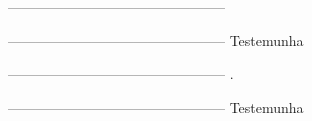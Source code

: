 \documentclass[12pt]{article}
\begin{document}


  \linespread{5}\selectfont


  \bigskip 
   \bigskip 
    \bigskip 
     \bigskip 
     
     
 \bigskip 
  \bigskip 
   \bigskip 
    \bigskip 
     \bigskip 
     
          
 \bigskip 
  \bigskip 
   \bigskip 
    \bigskip 
     \bigskip 
     
               
 \bigskip 
  \bigskip 
   \bigskip 
    \bigskip 
     \bigskip 
  
  
\begin{minipage}[b]{0.5\textwidth}
-----------------------------------------------
\newline
\nomelocador
\bigskip 
  \bigskip 
   \bigskip 
    \bigskip 
     \bigskip 

-----------------------------------------------
\newline
Testemunha
\end{minipage}
\begin{minipage}[b]{0.5\textwidth}
-----------------------------------------------
\newline
\nomelocatario.
\bigskip 
  \bigskip 
   \bigskip 
    \bigskip 
     \bigskip 

-----------------------------------------------
\newline
Testemunha
\end{minipage}
\end{document}
